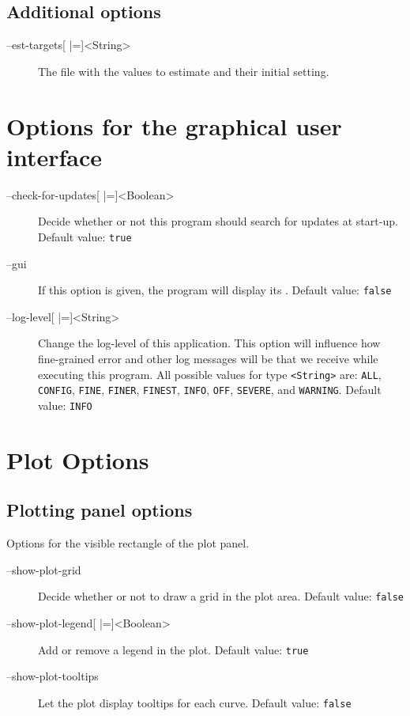 \subsection{Additional options}
\begin{description}
\item[--est-targets{[} |={]}<String>]
          The file with the values to estimate and their initial setting.
\end{description}

\section{Options for the graphical user interface}
\begin{description}
\item[--check-for-updates{[} |={]}<Boolean>]
          Decide whether or not this program should search for updates
          at start-up.
          Default value: \texttt{true}
\item[--gui]
          If this option is given, the program will display its \GUI.
          Default value: \texttt{false}
\item[--log-level{[} |={]}<String>]
          Change the log-level of this application. This option will influence
          how fine-grained error and other log messages will be that we
          receive while executing this program.
          All possible values for type \texttt{<String>} are:
          \texttt{ALL}, \texttt{CONFIG},
          \texttt{FINE}, \texttt{FINER},
          \texttt{FINEST}, \texttt{INFO},
          \texttt{OFF}, \texttt{SEVERE}, and \texttt{WARNING}.
          Default value: \texttt{INFO}
\end{description}

\section{Plot Options}
\subsection{Plotting panel options}
Options for the visible rectangle of the plot panel.
\begin{description}
\item[--show-plot-grid]
          Decide whether or not to draw a grid in the plot area.
          Default value: \texttt{false}
\item[--show-plot-legend{[} |={]}<Boolean>]
          Add or remove a legend in the plot.
          Default value: \texttt{true}
\item[--show-plot-tooltips]
          Let the plot display tooltips for each curve.
          Default value: \texttt{false}
\end{description}

